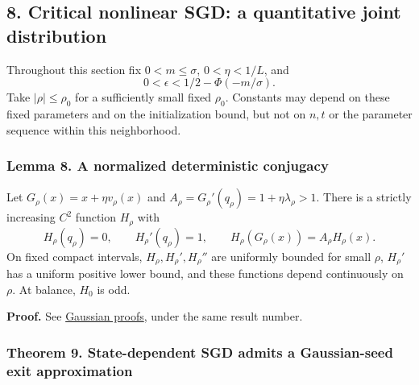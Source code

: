 \subsection{8. Critical nonlinear SGD: a quantitative joint
distribution}\label{draft-critical-nonlinear-sgd-a-quantitative-joint-distribution}

Throughout this section fix \(0<m\le\sigma\), \(0<\eta<1/L\), and \[
0<\epsilon<1/2-\Phi(-m/\sigma).
\] Take \(|\rho|\le\rho_0\) for a sufficiently small fixed \(\rho_0\).
Constants may depend on these fixed parameters and on the initialization
bound, but not on \(n,t\) or the parameter sequence within this
neighborhood.

\subsubsection{Lemma 8. A normalized deterministic
conjugacy}\label{draft-lemma-8.-a-normalized-deterministic-conjugacy}

Let \(G_\rho(x)=x+\eta v_\rho(x)\) and
\(A_\rho=G_\rho'(q_\rho)=1+\eta\lambda_\rho>1\). There is a strictly
increasing \(C^2\) function \(H_\rho\) with \[
H_\rho(q_\rho)=0,\qquad H_\rho'(q_\rho)=1,\qquad
H_\rho(G_\rho(x))=A_\rho H_\rho(x).
\] On fixed compact intervals, \(H_\rho,H_\rho',H_\rho''\) are uniformly
bounded for small \(\rho\), \(H_\rho'\) has a uniform positive lower
bound, and these functions depend continuously on \(\rho\). At balance,
\(H_0\) is odd.

\textbf{Proof.} See \href{gaussian_proofs.md}{Gaussian proofs}, under
the same result number.

\subsubsection{Theorem 9. State-dependent SGD admits a Gaussian-seed
exit
approximation}\label{draft-theorem-9.-state-dependent-sgd-admits-a-gaussian-seed-exit-approximation}

